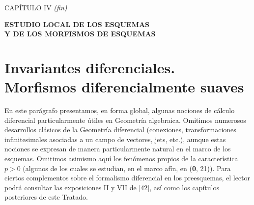 \clearpage
\thispagestyle{plain}
\label{chapter:IV4-fr}
\begin{center}
{\large CAPÍTULO IV \textit{(fin)}\par}
\vspace{1.5em}
{\Large\bfseries ESTUDIO LOCAL DE LOS ESQUEMAS\\
Y DE LOS MORFISMOS DE ESQUEMAS\par}
\end{center}
\section{Invariantes diferenciales. Morfismos diferencialmente suaves}
\label{section:IV.16}

En este parágrafo presentamos, en forma global, algunas nociones de cálculo
diferencial particularmente útiles en Geometría algebraica. Omitimos numerosos
desarrollos clásicos de la Geometría diferencial (conexiones, transformaciones
infinitesimales asociadas a un campo de vectores, jets, etc.), aunque estas nociones
se expresan de manera particularmente natural en el marco de los esquemas. Omitimos
asimismo aquí los fenómenos propios de la característica $p>0$ (algunos de los cuales
se estudian, en el marco afín, en (\textbf 0, 21)). Para ciertos complementos sobre el
formalismo diferencial en los preesquemas, el lector podrá consultar las exposiciones
II y VII de [42], así como los capítulos posteriores de este Tratado.
